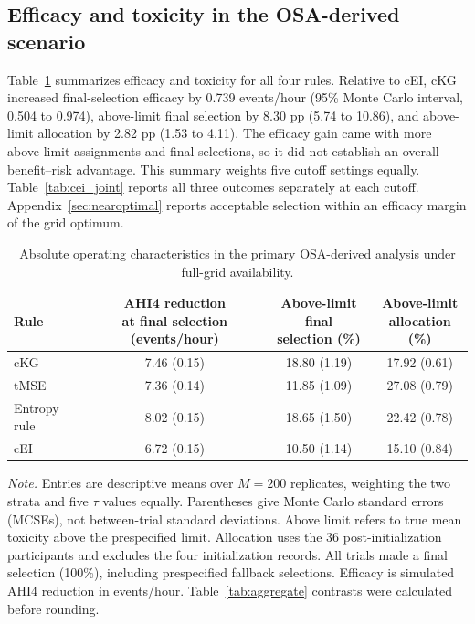 \documentclass[11pt]{article}
\newcommand{\rev}[1]{{#1}}
\newcommand{\revisioncolor}{}
\begin{document}
\subsection{\rev{Efficacy and toxicity in the OSA-derived scenario}}

\rev{Table~\ref{tab:osa_absolute_oc} summarizes efficacy and toxicity for all four rules.} Relative to cEI, cKG increased final-selection efficacy by \rev{0.739 events/hour} (95\% Monte Carlo interval, 0.504 to 0.974), above-limit final selection by 8.30 \rev{pp} (5.74 to 10.86), and above-limit allocation by 2.82 \rev{pp} (1.53 to 4.11). \rev{The efficacy gain came with more above-limit assignments and final selections, so it did not establish an overall benefit--risk advantage.} This summary weights five cutoff settings equally. \rev{Table~\ref{tab:cei_joint} reports all three outcomes separately at each cutoff.} \rev{Appendix~\ref{sec:nearoptimal} reports acceptable selection within an efficacy margin of the grid optimum.}

\begin{table}[H]
\revisioncolor
\centering
\footnotesize
\setlength{\tabcolsep}{4pt}
\caption{Absolute operating characteristics in the primary OSA-derived analysis under full-grid availability.}
\label{tab:osa_absolute_oc}
\begin{tabular}{@{}lccc@{}}
\toprule
Rule & \shortstack{\rev{AHI4 reduction}\\\rev{at final selection (events/hour)}} & \shortstack{Above-limit final\\selection (\%)} & \shortstack{Above-limit\\allocation (\%)} \\
\midrule
cKG & 7.46 (0.15) & 18.80 (1.19) & 17.92 (0.61) \\
tMSE & 7.36 (0.14) & 11.85 (1.09) & 27.08 (0.79) \\
Entropy rule & 8.02 (0.15) & 18.65 (1.50) & 22.42 (0.78) \\
cEI & 6.72 (0.15) & 10.50 (1.14) & 15.10 (0.84) \\
\bottomrule
\end{tabular}
\vspace{3pt}
\begin{minipage}{0.98\linewidth}
\scriptsize\raggedright
\textit{Note.} \rev{Entries are descriptive means over $M=200$ replicates, weighting the two strata and five $\tau$ values equally. Parentheses give Monte Carlo standard errors (MCSEs), not between-trial standard deviations.} Above limit refers to true mean toxicity above the prespecified limit. Allocation uses the 36 post-initialization participants and excludes the four initialization records. All trials made a final selection (100\%), including prespecified fallback selections. \rev{Efficacy is simulated AHI4 reduction in events/hour.} Table~\ref{tab:aggregate} contrasts were calculated before rounding.
\end{minipage}
\end{table}
\end{document}
